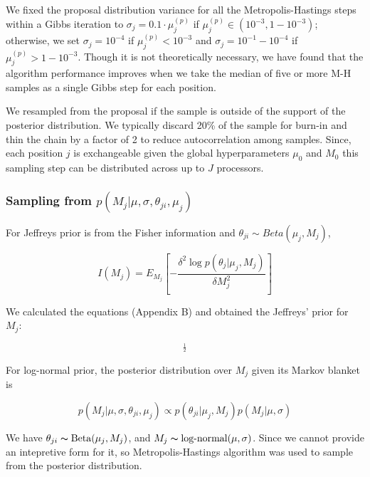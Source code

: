 \documentclass[11pt,reqno]{amsart}
\begin{document}
We fixed the proposal distribution variance for all the Metropolis-Hastings steps within a Gibbs iteration to $\sigma_j = 0.1 \cdot \mu_j^{(p)}$ if $\mu_j^{(p)} \in (10^{-3},1-10^{-3})$; otherwise, we set $\sigma_j = 10^{-4}$ if $\mu_j^{(p)}< 10^{-3}$ and $\sigma_j = 10^{-1}-10^{-4}$ if $\mu_j^{(p)}>1-10^{-3}$. Though it is not theoretically necessary, we have found that the algorithm performance improves when we take the median of five or more M-H samples as a single Gibbs step for each position.


We resampled from the proposal if the sample is outside of the support of the posterior distribution. We typically discard 20\% of the sample for burn-in and thin the chain by a factor of 2 to reduce autocorrelation among samples. Since, each position $j$ is exchangeable given the global hyperparameters $\mu_0$ and $M_0$ this sampling step can be distributed across up to $J$ processors.

\subsubsection{Sampling from $p \left( M_{j} |\mu,\sigma, \theta_{ji},\mu_j\right)$}
For Jeffreys prior is from the Fisher information and ${\theta }_{ji}\sim Beta\left( {\mu }_{j},{M}_{j}\right)$,

\begin{equation}\label{equ:JefferyInference}
I\left({M}_{j}\right)={E}_{{M}_{j}}\left[ -\frac{\delta ^{2}\log p\left(\theta _{j}|\mu_{j},M_{j}\right)}{\delta M^{2}_{j}}\right]
\end{equation}

We calculated the equations (Appendix B) and obtained the Jeffreys' prior for $M_j$:

\begin{equation}
[-\left(\Psi_{1}(M_{j}) - \Psi_{1}(\mu_{j} M_{j})\mu_{j}^{2} - \Psi_{1}((1-\mu_{j})M_{j}){(1-\mu_{j})^{2}}\right)]^{\frac{1}{2}}
\end{equation}

For log-normal prior, the posterior distribution over $M_{j}$ given its Markov blanket is

\begin{equation}
	p( M_{j} |\mu, \sigma, \theta_{ji},\mu_j) \propto p(\theta_{ji} | \mu_j, M_j) p(M_{j} | \mu, \sigma)
\end{equation}

We have $ \theta_{ji}\thicksim\text{Beta}(\mu_{j},M_{j})$, and $ M_{j} \thicksim \text{log-normal}(\mu, \sigma)$. Since we cannot provide an intepretive form for it, so Metropolis-Hastings algorithm was used to sample from the posterior distribution.
\end{document}
